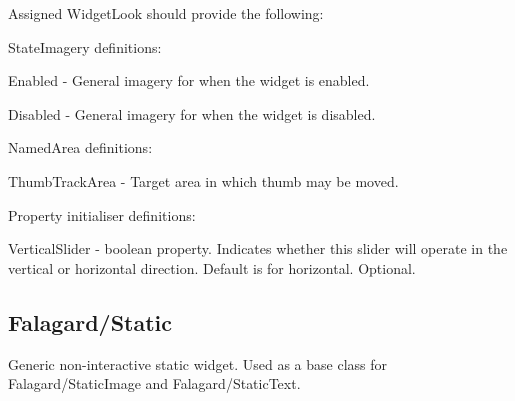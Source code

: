 Assigned Widget\+Look should provide the following\+: 
\begin{DoxyItemize}
\item State\+Imagery definitions\+: 
\begin{DoxyItemize}
\item Enabled -\/ General imagery for when the widget is enabled. 
\item Disabled -\/ General imagery for when the widget is disabled. 
\end{DoxyItemize}


\item Named\+Area definitions\+: 
\begin{DoxyItemize}
\item Thumb\+Track\+Area -\/ Target area in which thumb may be moved. 
\end{DoxyItemize}


\item Property initialiser definitions\+: 
\begin{DoxyItemize}
\item Vertical\+Slider -\/ boolean property. Indicates whether this slider will operate in the vertical or horizontal direction. Default is for horizontal. Optional. 
\end{DoxyItemize}
\end{DoxyItemize}\hypertarget{fal_wr_ref_fal_wr_ref_sec_20}{}\subsection{Falagard/\+Static}\label{fal_wr_ref_fal_wr_ref_sec_20}
Generic non-\/interactive \textquotesingle{}static\textquotesingle{} widget. Used as a base class for Falagard/\+Static\+Image and Falagard/\+Static\+Text.

